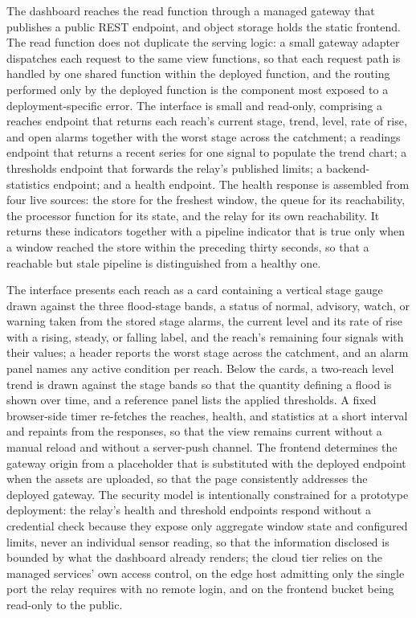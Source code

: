 \documentclass[conference]{IEEEtran}
\begin{document}
The dashboard reaches the read function through a managed gateway that publishes a public REST endpoint, and object storage holds the static frontend. The read function does not duplicate the serving logic: a small gateway adapter dispatches each request to the same view functions, so that each request path is handled by one shared function within the deployed function, and the routing performed only by the deployed function is the component most exposed to a deployment-specific error. The interface is small and read-only, comprising a reaches endpoint that returns each reach's current stage, trend, level, rate of rise, and open alarms together with the worst stage across the catchment; a readings endpoint that returns a recent series for one signal to populate the trend chart; a thresholds endpoint that forwards the relay's published limits; a backend-statistics endpoint; and a health endpoint. The health response is assembled from four live sources: the store for the freshest window, the queue for its reachability, the processor function for its state, and the relay for its own reachability. It returns these indicators together with a pipeline indicator that is true only when a window reached the store within the preceding thirty seconds, so that a reachable but stale pipeline is distinguished from a healthy one.

The interface presents each reach as a card containing a vertical stage gauge drawn against the three flood-stage bands, a status of normal, advisory, watch, or warning taken from the stored stage alarms, the current level and its rate of rise with a rising, steady, or falling label, and the reach's remaining four signals with their values; a header reports the worst stage across the catchment, and an alarm panel names any active condition per reach. Below the cards, a two-reach level trend is drawn against the stage bands so that the quantity defining a flood is shown over time, and a reference panel lists the applied thresholds. A fixed browser-side timer re-fetches the reaches, health, and statistics at a short interval and repaints from the responses, so that the view remains current without a manual reload and without a server-push channel. The frontend determines the gateway origin from a placeholder that is substituted with the deployed endpoint when the assets are uploaded, so that the page consistently addresses the deployed gateway. The security model is intentionally constrained for a prototype deployment: the relay's health and threshold endpoints respond without a credential check because they expose only aggregate window state and configured limits, never an individual sensor reading, so that the information disclosed is bounded by what the dashboard already renders; the cloud tier relies on the managed services' own access control, on the edge host admitting only the single port the relay requires with no remote login, and on the frontend bucket being read-only to the public.
\end{document}
